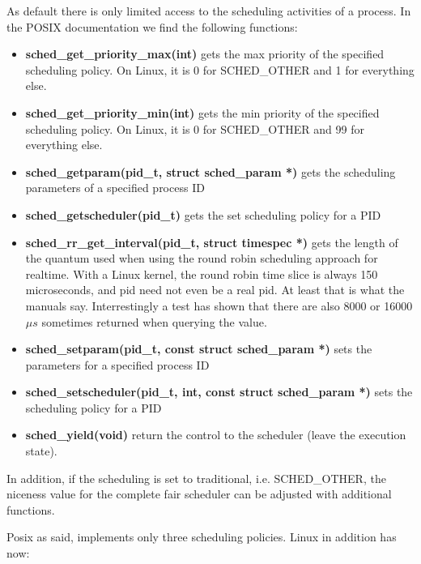 \documentclass[]{scrartcl}
\begin{document}
As default there is only limited access to the scheduling activities of a process.
In the POSIX documentation we find the following functions:

\begin{itemize}
	\item \textbf{sched\_get\_priority\_max(int)}
		gets the max priority of the specified scheduling policy. On Linux, it is 0 for SCHED\_OTHER and 1 for everything else. 
	
	\item \textbf{sched\_get\_priority\_min(int)}
		gets the min priority of the specified scheduling policy. On Linux, it is 0 for SCHED\_OTHER and 99 for everything else. 
		
	\item \textbf{sched\_getparam(pid\_t, struct sched\_param *)}
		gets the scheduling parameters of a specified process ID
	
	\item \textbf{sched\_getscheduler(pid\_t)}
		gets the set scheduling policy for a PID
	
	\item \textbf{sched\_rr\_get\_interval(pid\_t, struct timespec *)}
		gets the length of the quantum used when using the round robin scheduling approach for realtime.
		With a Linux kernel, the round robin time slice is always 150 microseconds, and pid need not even be a real pid. At least that is what the manuals say. Interrestingly a test has shown that there are also 8000 or 16000 $\mu s$ sometimes returned when querying the value.
	
	\item \textbf{sched\_setparam(pid\_t, const struct sched\_param *)}
		sets the parameters for a specified process ID
	
	\item \textbf{sched\_setscheduler(pid\_t, int, const struct sched\_param *)}
		sets the scheduling policy for a PID
	
	\item \textbf{sched\_yield(void)}
		return the control to the scheduler (leave the execution state).
\end{itemize}

In addition, if the scheduling is set to traditional, i.e. SCHED\_OTHER, the niceness value for the complete fair scheduler can be adjusted with additional functions. 

Posix as said, implements only three scheduling policies.
Linux in addition has now:
\end{document}
